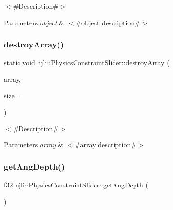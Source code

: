 $<$\#\+Description\#$>$


\begin{DoxyParams}{Parameters}
{\em object} & $<$\#object description\#$>$ \\
\hline
\end{DoxyParams}
\mbox{\label{classnjli_1_1_physics_constraint_slider_a293103ad00ee8f7fd7d2ddc6ba82e56b}} 
\subsubsection{\texorpdfstring{destroy\+Array()}{destroyArray()}}
{\footnotesize\ttfamily static \mbox{\hyperlink{_thread_8h_af1e856da2e658414cb2456cb6f7ebc66}{void}} njli\+::\+Physics\+Constraint\+Slider\+::destroy\+Array (\begin{DoxyParamCaption}\item[{\mbox{\hyperlink{classnjli_1_1_physics_constraint_slider}{Physics\+Constraint\+Slider}} $\ast$$\ast$}]{array,  }\item[{const \mbox{\hyperlink{_util_8h_a10e94b422ef0c20dcdec20d31a1f5049}{u32}}}]{size = {} }\end{DoxyParamCaption})\hspace{0.3cm}{\ttfamily [static]}}

$<$\#\+Description\#$>$


\begin{DoxyParams}{Parameters}
{\em array} & $<$\#array description\#$>$ \\
\hline
\end{DoxyParams}
\mbox{\label{classnjli_1_1_physics_constraint_slider_a1f98662c2eec6024fb68e54031afabed}} 
\subsubsection{\texorpdfstring{get\+Ang\+Depth()}{getAngDepth()}}
{\footnotesize\ttfamily \mbox{\hyperlink{_util_8h_a5f6906312a689f27d70e9d086649d3fd}{f32}} njli\+::\+Physics\+Constraint\+Slider\+::get\+Ang\+Depth (\begin{DoxyParamCaption}{ }\end{DoxyParamCaption})}

